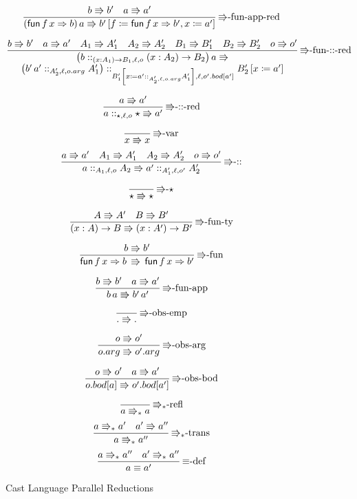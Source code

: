 \begin{figure}
\[
\frac{b\Rrightarrow b'\quad a\Rrightarrow a'}{\left(\mathsf{fun}\,f\,x\Rightarrow b\right)a\Rrightarrow b'\left[f\coloneqq\mathsf{fun}\,f\,x\Rightarrow b',x\coloneqq a'\right]}\,\textrm{\ensuremath{\Rrightarrow}-fun-app-red}
\]

\[
\frac{b\Rrightarrow b'\quad a\Rrightarrow a'\quad A_{1}\Rrightarrow A_{1}'\quad A_{2}\Rrightarrow A_{2}'\quad B_{1}\Rrightarrow B_{1}'\quad B_{2}\Rrightarrow B_{2}'\quad o\Rrightarrow o'}{\begin{array}{c}
\left(b::_{\left(x:A_{1}\right)\rightarrow B_{1},\ensuremath{\ell},o}\left(x:A_{2}\right)\rightarrow B_{2}\right)a\Rrightarrow\\
\left(b'\,a'::_{A_{2}',\ell,o.arg}A_{1}'\right)::_{B_{1}'\left[x\coloneqq a'::_{A_{2}',\ell,o.arg}A_{1}'\right],\ensuremath{\ell},o'.bod[a']}B_{2}'\left[x\coloneqq a'\right]
\end{array}}\,\textrm{\ensuremath{\Rrightarrow}-fun-::-red}
\]

\[
\frac{a\Rrightarrow a'}{a::_{\star,\ensuremath{\ell},o}\star\Rrightarrow a'}\,\textrm{\ensuremath{\Rrightarrow}-::-red}
\]

\[
\frac{\,}{x\Rrightarrow x}\,\textrm{\ensuremath{\Rrightarrow}-var}
\]
\[
\frac{a\Rrightarrow a'\quad A_{1}\Rrightarrow A_{1}'\quad A_{2}\Rrightarrow A_{2}'\quad o\Rrightarrow o'}{a::_{A_{1},\ensuremath{\ell},o}A_{2}\Rrightarrow a'::_{A_{1}',\ensuremath{\ell},o'}A_{2}'}\,\textrm{\ensuremath{\Rrightarrow}-::}
\]

\[
\frac{\,}{\star\Rrightarrow\star}\,\textrm{\ensuremath{\Rrightarrow}-}\star
\]

\[
\frac{A\Rrightarrow A'\quad B\Rrightarrow B'}{\left(x:A\right)\rightarrow B\Rrightarrow\left(x:A'\right)\rightarrow B'}\,\textrm{\ensuremath{\Rrightarrow}-fun-ty}
\]

\[
\frac{b\Rrightarrow b'}{\mathsf{fun}\,f\,x\Rightarrow b\,\Rrightarrow\,\mathsf{fun}\,f\,x\Rightarrow b'}\,\textrm{\ensuremath{\Rrightarrow}-fun}
\]

\[
\frac{b\Rrightarrow b'\quad a\Rrightarrow a'}{b\,a\Rrightarrow b'\,a'}\,\textrm{\ensuremath{\Rrightarrow}-fun-app}
\]

\[
\frac{\,}{.\Rrightarrow.}\,\textrm{\ensuremath{\Rrightarrow}-obs-emp}
\]

\[
\frac{o\Rrightarrow o'}{o.arg\Rrightarrow o'.arg}\,\textrm{\ensuremath{\Rrightarrow}-obs-arg}
\]

\[
\frac{o\Rrightarrow o'\quad a\Rrightarrow a'}{o.bod[a]\Rrightarrow o'.bod[a']}\,\textrm{\ensuremath{\Rrightarrow}-obs-bod}
\]

\[
\frac{\,}{a\Rrightarrow_{\ast}a}\,\textrm{\ensuremath{\Rrightarrow_{\ast}}-refl}
\]
\[
\frac{a\Rrightarrow_{\ast}a'\quad a'\Rrightarrow a''}{a\Rrightarrow_{\ast}a''}\,\textrm{\ensuremath{\Rrightarrow_{\ast}}-trans}
\]
\[
\frac{a\Rrightarrow_{\ast}a''\quad a'\Rrightarrow_{\ast}a''}{a\equiv a'}\,\textrm{\ensuremath{\equiv}-def}
\]

\caption{Cast Language Parallel Reductions}
\label{fig:cast-reduction}
\end{figure}


